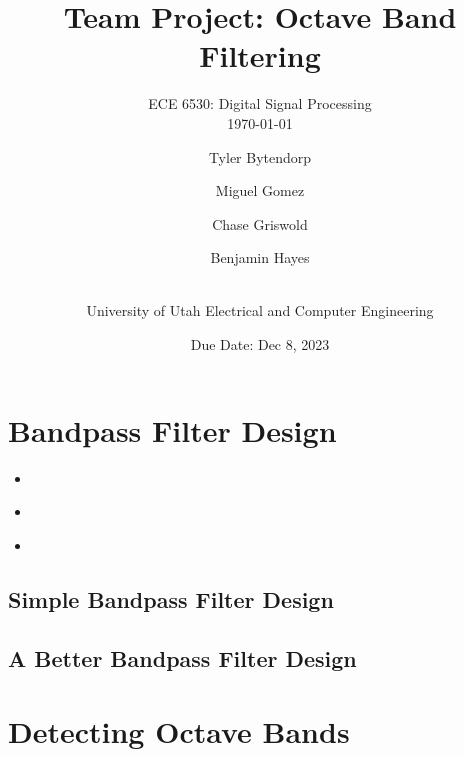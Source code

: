 \documentclass[a4paper, 11pt]{exam}
\title{Team Project: Octave Band Filtering}
\subtitle{ECE 6530: Digital Signal Processing \\
\today\\}
\author{ Tyler Bytendorp \and Miguel Gomez \and Chase Griswold \and Benjamin Hayes \and\\
University of Utah Electrical and Computer Engineering}
\date{Due Date: Dec 8, 2023}
\begin{document}
\maketitle
\noindent
\setcounter{section}{3}
\section{Bandpass Filter Design}
\begin{itemize}
  \item \alph  \\ 
  \item \alph  \\ 
  \item \alph  \\
\end{itemize}
\subsection{Simple Bandpass Filter Design}
\subsection{A Better Bandpass Filter Design}
\section{Detecting Octave Bands}
\end{document}
